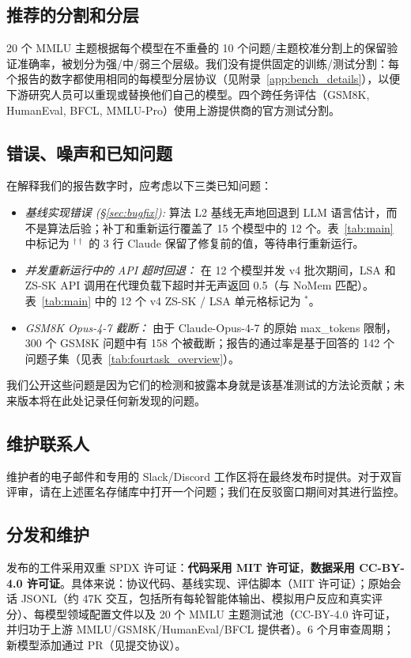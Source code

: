 \documentclass[11pt,a4paper,fontset=fandol]{ctexart}
\begin{document}
\subsection*{推荐的分割和分层}
20 个 MMLU 主题根据每个模型在不重叠的 10 个问题/主题校准分割上的保留验证准确率，被划分为强/中/弱三个层级。我们没有提供固定的训练/测试分割：每个报告的数字都使用相同的每模型分层协议（见附录~\ref{app:bench_details}），以便下游研究人员可以重现或替换他们自己的模型。四个跨任务评估（GSM8K, HumanEval, BFCL, MMLU-Pro）使用上游提供商的官方测试分割。

\subsection*{错误、噪声和已知问题}
在解释我们的报告数字时，应考虑以下三类已知问题：
\begin{itemize}[nosep,leftmargin=1.4em]
  \item \emph{基线实现错误 (\S\ref{sec:bugfix}):} 算法 L2 基线无声地回退到 LLM 语言估计，而不是算法后验；补丁和重新运行覆盖了 15 个模型中的 12 个。表~\ref{tab:main} 中标记为 $^{\dagger\dagger}$ 的 3 行 Claude 保留了修复前的值，等待串行重新运行。
  \item \emph{并发重新运行中的 API 超时回退：} 在 12 个模型并发 v4 批次期间，LSA 和 ZS-SK API 调用在代理负载下超时并无声返回 0.5（与 NoMem 匹配）。表~\ref{tab:main} 中的 12 个 v4 ZS-SK / LSA 单元格标记为 $^*$。
  \item \emph{GSM8K Opus-4-7 截断：} 由于 Claude-Opus-4-7 的原始 max\_tokens 限制，300 个 GSM8K 问题中有 158 个被截断；报告的通过率是基于回答的 142 个问题子集（见表~\ref{tab:fourtask_overview}）。
\end{itemize}
我们公开这些问题是因为它们的检测和披露本身就是该基准测试的方法论贡献；未来版本将在此处记录任何新发现的问题。

\subsection*{维护联系人}
维护者的电子邮件和专用的 Slack/Discord 工作区将在最终发布时提供。对于双盲评审，请在上述匿名存储库中打开一个问题；我们在反驳窗口期间对其进行监控。

\subsection*{分发和维护}
发布的工件采用双重 SPDX 许可证：\textbf{代码采用 MIT 许可证}，\textbf{数据采用 CC-BY-4.0 许可证}。具体来说：协议代码、基线实现、评估脚本（MIT 许可证）；原始会话 JSONL（约 47K 交互，包括所有每轮智能体输出、模拟用户反应和真实评分）、每模型领域配置文件以及 20 个 MMLU 主题测试池（CC-BY-4.0 许可证，并归功于上游 MMLU/GSM8K/HumanEval/BFCL 提供者）。6 个月审查周期；新模型添加通过 PR（见提交协议）。
\end{document}
